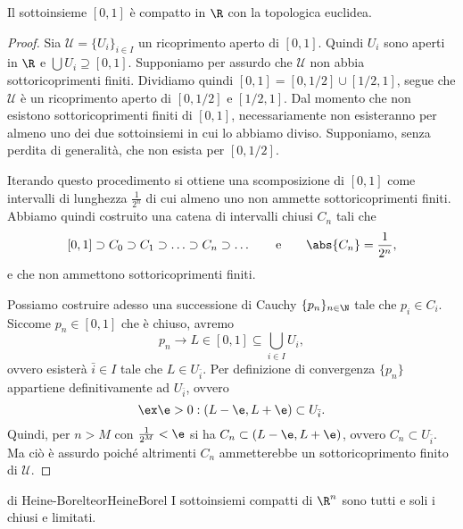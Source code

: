 \begin{lem}
	Il sottoinsieme \([0,1]\) è compatto in \(\R\) con la topologica euclidea.
\end{lem}

\begin{proof}
	Sia \(\mathcal{U}=\{U_i\}_{i\in I}\) un ricoprimento aperto di \([0,1]\).
	Quindi \(U_i\) sono aperti in \(\R\) e \(\bigcup U_i \supseteq [0,1]\).
	Supponiamo per assurdo che \(\mathcal{U}\) non abbia sottoricoprimenti finiti.
	Dividiamo quindi \([0,1]=[0,1/2]\cup [1/2,1]\), segue che \(\mathcal{U}\) è un ricoprimento aperto di \([0,1/2]\) e \([1/2,1]\).
	Dal momento che non esistono sottoricoprimenti finiti di \([0,1]\), necessariamente non esisteranno per almeno uno dei due sottoinsiemi in cui lo abbiamo diviso.
	Supponiamo, senza perdita di generalità, che non esista per \([0,1/2]\).

	Iterando questo procedimento si ottiene una scomposizione di \([0,1]\) come intervalli di lunghezza \(\frac{1}{2^n}\) di cui almeno uno non ammette sottoricoprimenti finiti.
	Abbiamo quindi costruito una catena di intervalli chiusi \(C_n\) tali che
	\[
		[0,1] \supset C_0 \supset C_1 \supset \ldots \supset C_n \supset \ldots \qquad\text{e}\qquad \abs{C_n} = \frac{1}{2^n},
	\]
	e che non ammettono sottoricoprimenti finiti.

	Possiamo costruire adesso una successione di Cauchy \(\{p_n\}_{n\in\N}\) tale che \(p_i\in C_i\).
	Siccome \(p_n\in [0,1]\) che è chiuso, avremo
	\[
		p_n \to L \in [0,1] \subseteq \bigcup_{i\in I} U_i,
	\]
	ovvero esisterà \(\bar{i}\in I\) tale che \(L \in U_{\bar{i}}\).
	Per definizione di convergenza \(\{p_n\}\) appartiene definitivamente ad \(U_{\bar{i}}\), ovvero
	\[
		\ex \e>0 : (L-\e,L+\e) \subset U_{\bar{i}}.
	\]
	Quindi, per \(n>M\) con \(\frac{1}{2^M}<\e\) si ha \(C_n \subset (L-\e,L+\e)\), ovvero \(C_n \subset U_{\bar{i}}\).
	Ma ciò è assurdo poiché altrimenti \(C_n\) ammetterebbe un sottoricoprimento finito di \(\mathcal{U}\).
\end{proof}

\begin{teor}{di Heine-Borel}{teorHeineBorel}
	I sottoinsiemi compatti di \(\R^n\) sono tutti e soli i chiusi e limitati.
\end{teor}


